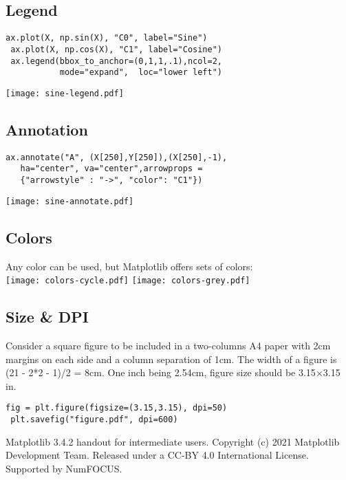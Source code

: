 \documentclass[10pt,landscape,a4paper]{article}
\begin{document}
\begin{multicols*}{3}
\subsection*{\rmfamily Legend}
\begin{lstlisting}[]
 ax.plot(X, np.sin(X), "C0", label="Sine")
 ax.plot(X, np.cos(X), "C1", label="Cosine")
 ax.legend(bbox_to_anchor=(0,1,1,.1),ncol=2,
           mode="expand",  loc="lower left")
\end{lstlisting}
\texttt{[image: sine-legend.pdf]}

\subsection*{\rmfamily Annotation}
\begin{lstlisting}[]
 ax.annotate("A", (X[250],Y[250]),(X[250],-1),
   ha="center", va="center",arrowprops =
   {"arrowstyle" : "->", "color": "C1"})
\end{lstlisting}
\texttt{[image: sine-annotate.pdf]}

\subsection*{\rmfamily Colors}

Any color can be used, but Matplotlib offers sets of colors:\\
\texttt{[image: colors-cycle.pdf]} \smallskip
\texttt{[image: colors-grey.pdf]}\\

\vspace{-1em}
\subsection*{\rmfamily Size \& DPI}

Consider a square figure to be included in a two-columns A4 paper with
2cm margins on each side and a column separation of 1cm. The width of
a figure is (21 - 2*2 - 1)/2 = 8cm. One inch being 2.54cm, figure size
should be 3.15$\times$3.15 in.
\begin{lstlisting}[]
 fig = plt.figure(figsize=(3.15,3.15), dpi=50)
 plt.savefig("figure.pdf", dpi=600)
\end{lstlisting}


\vfill
%
{\scriptsize
  Matplotlib 3.4.2 handout for intermediate users.
  Copyright (c) 2021 Matplotlib Development Team.
  Released under a CC-BY 4.0 International License.
  Supported by NumFOCUS.
\par}



\end{multicols*}
\end{document}
